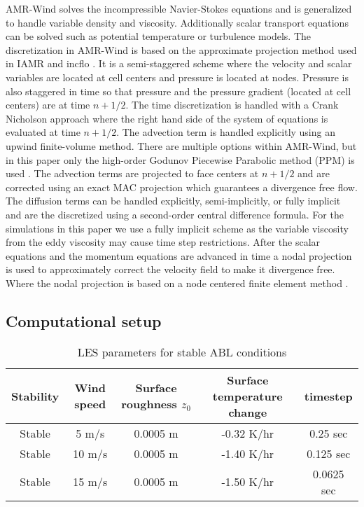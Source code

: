 AMR-Wind solves the incompressible Navier-Stokes equations and is generalized to
handle variable density and viscosity. Additionally scalar transport equations can be 
solved such as potential temperature or turbulence models. The discretization in AMR-Wind
is based on the approximate projection method used in IAMR \cite{almgren1998conservative} 
and incflo \cite{sverdrup2018highly}. It is a semi-staggered scheme where the velocity and scalar 
variables are located at cell centers and pressure is located at nodes. Pressure is also staggered
in time so that pressure and the pressure gradient (located at cell centers) are at time $n+1/2$. 
The time discretization is handled with a Crank Nicholson approach where the right hand side 
of the system of equations is evaluated at time $n+1/2$. The advection term is handled explicitly
using an upwind finite-volume method. There are multiple options
within AMR-Wind, but in this paper only the high-order Godunov Piecewise Parabolic 
method (PPM) is used \cite{Colella1984}. The advection terms are projected to face 
centers at $n+1/2$ and are corrected using an exact MAC projection \cite{almgren1998conservative}
which guarantees a divergence free flow. The diffusion terms can be handled explicitly, semi-implicitly, 
or fully implicit and are the discretized using a second-order central difference formula. 
For the simulations in this paper we use a fully implicit scheme as the variable viscosity 
from the eddy viscosity may cause time step restrictions. After the scalar equations
and the momentum equations are advanced in time a nodal projection is used to 
approximately correct the velocity field to make it divergence free. Where the nodal projection
is based on a node centered finite element method \cite{almgren1998conservative}.


\subsection{Computational setup}


\begin{table}
\caption{\label{tab:z0tempparam} LES parameters for stable ABL conditions}
\centering
\begin{tabular}{ccccc}
  \hline
  Stability & Wind speed & Surface roughness $z_0$ & Surface
  temperature change & timestep\\
  \hline
  Stable       & 5  m/s           & 0.0005 m       & -0.32 K/hr   & 0.25 sec   \\
  Stable       & 10 m/s           & 0.0005 m       & -1.40 K/hr   & 0.125 sec  \\
  Stable       & 15 m/s           & 0.0005 m       & -1.50 K/hr   & 0.0625 sec \\
\hline
\end{tabular}
\end{table}

